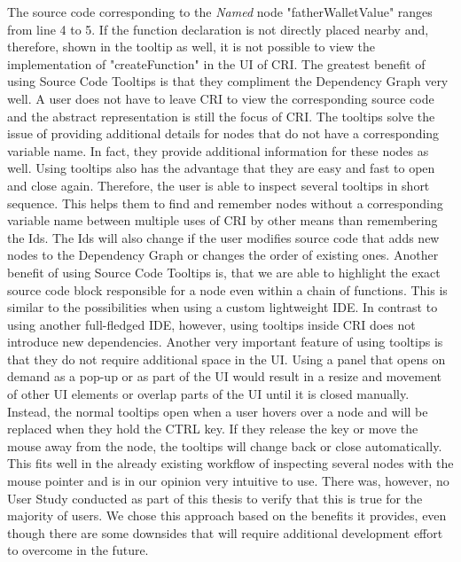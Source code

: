 The source code corresponding to the \emph{Named} node "fatherWalletValue" ranges from line 4 to 5. If the function declaration is not directly placed nearby and, therefore, shown in the tooltip as well, it is not possible to view the implementation of "createFunction" in the UI of CRI.
The greatest benefit of using Source Code Tooltips is that they compliment the Dependency Graph very well. A user does not have to leave CRI to view the corresponding source code and the abstract representation is still the focus of CRI. The tooltips solve the issue of providing additional details for nodes that do not have a corresponding variable name. In fact, they provide additional information for these nodes as well. Using tooltips also has the advantage that they are easy and fast to open and close again. Therefore, the user is able to inspect several tooltips in short sequence. This helps them to find and remember nodes without a corresponding variable name between multiple uses of CRI by other means than remembering the Ids.  The Ids will also change if the user modifies source code that adds new nodes to the Dependency Graph or changes the order of existing ones. Another benefit of using Source Code Tooltips is, that we are able to highlight the exact source code block responsible for a node even within a chain of functions. This is similar to the possibilities when using a  custom lightweight IDE. In contrast to using another full-fledged IDE, however, using tooltips inside CRI does not introduce new dependencies. Another very important feature of using tooltips is that they do not require additional space in the UI. Using a panel that opens on demand as a pop-up or as part of the UI would result in a resize and movement of other UI elements or overlap parts of the UI until it is closed manually. Instead, the normal tooltips open when a user hovers over a node and will be replaced when they hold the CTRL key. If they release the key or move the mouse away from the node, the tooltips will change back or close automatically. This fits well in the already existing workflow of inspecting several nodes with the mouse pointer and is in our opinion very intuitive to use. There was, however, no User Study conducted as part of this thesis to verify that this is true for the majority of users. We chose this approach based on the benefits it provides, even though there are some downsides that will require additional development effort to overcome in the future.
			
